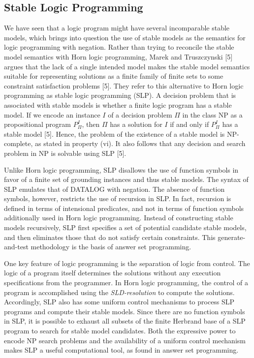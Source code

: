 \subsection{Stable Logic Programming} 
We have seen that a logic program might have several incomparable stable models, 
which brings into question the use of stable models as the semantics for 
logic programming with negation. Rather 
than trying to reconcile the stable model semantics with Horn logic programming, 
Marek and Truszczynski [5] argues that the lack of a single intended model 
makes the stable model semantics suitable for representing solutions 
as a finite family of finite sets to some constraint satisfaction problems [5]. 
They refer to this alternative to Horn logic programming 
as stable logic programming (SLP). A decision problem that is associated with 
stable models is whether a finite logic program has a stable model. If we 
encode an instance $I$ of a decision problem $\Pi$ in the class NP as a propositional program 
$P ^I _ \Pi$, then $\Pi$ has a solution for $I$ if and only if $P ^I _ \Pi$ 
has a stable model [5]. Hence, the problem of the existence of a stable model is 
NP-complete, as stated in property (vi). It also follows that any decision and search 
problem in NP is solvable using SLP [5]. 

Unlike Horn logic programming, SLP disallows the use of function symbols in favor of 
a finite set of grounding instances and thus stable models. The syntax of SLP emulates 
that of DATALOG with negation. The absence of function symbols, however, restricts the 
use of recursion in SLP. In fact, recursion is defined in terms of intensional predicates, 
and not in terms of function symbols additionally used in Horn logic programming. Instead 
of constructing stable models recursively, SLP first specifies a set of potential candidate 
stable models, and then eliminates those that do not satisfy certain constraints. This 
generate-and-test methodology is the basis of answer set programming. 

One key feature of logic programming is the separation of logic from control. The logic 
of a program itself determines the solutions without any execution specifications from 
the programmer. In Horn logic programming, the control of a program is accomplished 
using the \textit{SLD-resolution} to compute the solutions. Accordingly, SLP also 
has some uniform control mechanisms to process SLP programs and compute their stable models. 
Since there are no function symbols in SLP, it is possible to exhaust all subsets of the 
finite Herbrand base of a SLP program to search for stable model candidates. Both the 
expressive power to encode NP search problems and the availability of 
a uniform control mechanism makes SLP a useful computational tool, as found in answer set 
programming.

